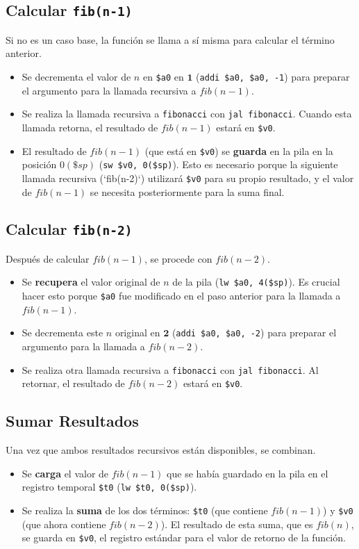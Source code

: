 \documentclass{article}
\begin{document}
\subsection*{Calcular \texttt{fib(n-1)}}
Si no es un caso base, la función se llama a sí misma para calcular el término anterior.
\begin{itemize}
    \item Se decrementa el valor de $n$ en \texttt{\$a0} en $\mathbf{1}$ (\texttt{addi \$a0, \$a0, -1}) para preparar el argumento para la llamada recursiva a $fib(n-1)$.
    \item Se realiza la llamada recursiva a \texttt{fibonacci} con \texttt{jal fibonacci}. Cuando esta llamada retorna, el resultado de $fib(n-1)$ estará en \texttt{\$v0}.
    \item El resultado de $fib(n-1)$ (que está en \texttt{\$v0}) se \textbf{guarda} en la pila en la posición $0(\$sp)$ (\texttt{sw \$v0, 0(\$sp)}). Esto es necesario porque la siguiente llamada recursiva (`fib(n-2)`) utilizará \texttt{\$v0} para su propio resultado, y el valor de $fib(n-1)$ se necesita posteriormente para la suma final.
\end{itemize}

\subsection*{Calcular \texttt{fib(n-2)}}
Después de calcular $fib(n-1)$, se procede con $fib(n-2)$.
\begin{itemize}
    \item Se \textbf{recupera} el valor original de $n$ de la pila (\texttt{lw \$a0, 4(\$sp)}). Es crucial hacer esto porque \texttt{\$a0} fue modificado en el paso anterior para la llamada a $fib(n-1)$.
    \item Se decrementa este $n$ original en $\mathbf{2}$ (\texttt{addi \$a0, \$a0, -2}) para preparar el argumento para la llamada a $fib(n-2)$.
    \item Se realiza otra llamada recursiva a \texttt{fibonacci} con \texttt{jal fibonacci}. Al retornar, el resultado de $fib(n-2)$ estará en \texttt{\$v0}.
\end{itemize}

\subsection*{Sumar Resultados}
Una vez que ambos resultados recursivos están disponibles, se combinan.
\begin{itemize}
    \item Se \textbf{carga} el valor de $fib(n-1)$ que se había guardado en la pila en el registro temporal \texttt{\$t0} (\texttt{lw \$t0, 0(\$sp)}).
    \item Se realiza la \textbf{suma} de los dos términos: \texttt{\$t0} (que contiene $fib(n-1)$) y \texttt{\$v0} (que ahora contiene $fib(n-2)$). El resultado de esta suma, que es $fib(n)$, se guarda en \texttt{\$v0}, el registro estándar para el valor de retorno de la función.
\end{itemize}
\end{document}
